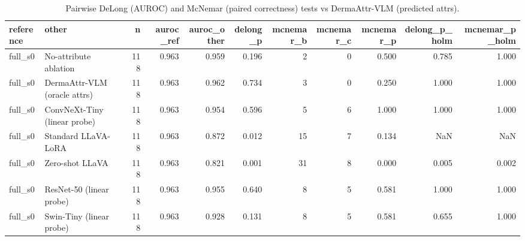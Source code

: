 \begin{table}
\caption{Pairwise DeLong (AUROC) and McNemar (paired correctness) tests vs DermaAttr-VLM (predicted attrs).}
\label{tab:pairwise_real}
\begin{tabular}{llrrrrrrrrr}
\toprule
reference & other & n & auroc_ref & auroc_other & delong_p & mcnemar_b & mcnemar_c & mcnemar_p & delong_p_holm & mcnemar_p_holm \\
\midrule
full_s0 & No-attribute ablation & 118 & 0.963 & 0.959 & 0.196 & 2 & 0 & 0.500 & 0.785 & 1.000 \\
full_s0 & DermaAttr-VLM (oracle attrs) & 118 & 0.963 & 0.962 & 0.734 & 3 & 0 & 0.250 & 1.000 & 1.000 \\
full_s0 & ConvNeXt-Tiny (linear probe) & 118 & 0.963 & 0.954 & 0.596 & 5 & 6 & 1.000 & 1.000 & 1.000 \\
full_s0 & Standard LLaVA-LoRA & 118 & 0.963 & 0.872 & 0.012 & 15 & 7 & 0.134 & NaN & NaN \\
full_s0 & Zero-shot LLaVA & 118 & 0.963 & 0.821 & 0.001 & 31 & 8 & 0.000 & 0.005 & 0.002 \\
full_s0 & ResNet-50 (linear probe) & 118 & 0.963 & 0.955 & 0.640 & 8 & 5 & 0.581 & 1.000 & 1.000 \\
full_s0 & Swin-Tiny (linear probe) & 118 & 0.963 & 0.928 & 0.131 & 8 & 5 & 0.581 & 0.655 & 1.000 \\
\bottomrule
\end{tabular}
\end{table}
